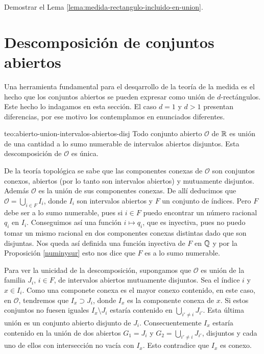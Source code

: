 \begin{ejercicio}{}
Demostrar el  Lema \ref{lema:medida-rectangulo-incluido-en-union}.
\end{ejercicio}


\section{Descomposición de conjuntos abiertos}

Una herramienta fundamental para el desqarrollo de la teoría de la medida es el hecho que los conjuntos abiertos se pueden expresar como unión de $d$-rectángulos. Este hecho lo indagamos en esta sección. El caso $d=1$ y $d>1$ presentan diferencias, por ese motivo los contemplamos en enunciados diferentes.  


\begin{teorema}{teo:abierto-union-intervalos-abiertos-disj}
Todo conjunto abierto $\mathcal{O}$ de $\mathbb{R}$ es uni\'on de una cantidad a lo sumo numerable de intervalos abiertos disjuntos. Esta descomposición de $\mathcal{O}$ es única.
\end{teorema}

\begin{demo} De la teoría topológica se sabe que  las componentes conexas de $\mathcal{O}$ son conjuntos conexos, abiertos (por lo tanto son intervalos abiertos)  y mutuamente disjuntos.  Además $\mathcal{O}$ es la unión de sus componentes conexas. De allí deducimos que  $\mathcal{O}=\bigcup_{i\in F}I_i$, donde $I_i$ son intervalos abiertos y $F$ un conjunto de índices. Pero $F$ debe ser a lo sumo numerable, pues si $i\in F$ puedo encontrar un número racional $q_i$ en $I_i$. Conseguimos así una función $i\mapsto q_i$, que es inyectiva, pues no puedo tomar un mismo racional en dos componentes conexas distintas dado que son disjuntas. Nos queda así definida una función inyectiva de $F$ en $\mathbb{Q}$ y por  la Proposición \ref{numinysur} esto nos dice que $F$ es a lo sumo numerable.

Para ver la unicidad de la descomposición, supongamos que $\mathcal{O}$ es unión de la familia $J_i$, $i\in F$, de intervalos abiertos mutuamente disjuntos. Sea el índice $i$ y $x\in I_i$. Como una componete conexa es el mayor conexo contenido, en este caso, en $\mathcal{O}$, tendremos que $I_x\supset J_i$, donde $I_x$ es la componente conexa de $x$.   Si estos conjuntos no  fuesen iguales $I_x\setminus J_i$ estaría contenido en  $\bigcup_{i'\neq i} J_{i'}$. Esta última unión es un conjunto abierto disjunto de $J_i$. Consecuentemente $I_x$ estaría contenido en la unión de dos abiertos $G_1=J_i$ y   $G_2=\bigcup_{i'\neq i} J_{i'}$, disjuntos y cada uno de ellos con intersección no vacía con $I_x$. Esto contradice que $I_x$ es conexo. \end{demo}

